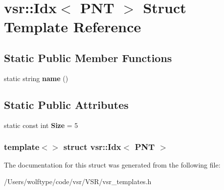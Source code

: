 \hypertarget{structvsr_1_1_idx_3_01_p_n_t_01_4}{\section{vsr\-:\-:Idx$<$ P\-N\-T $>$ Struct Template Reference}
\label{structvsr_1_1_idx_3_01_p_n_t_01_4}
}
\subsection*{Static Public Member Functions}
\begin{DoxyCompactItemize}
\item 
\hypertarget{structvsr_1_1_idx_3_01_p_n_t_01_4_abda2faacba30c4c8212985234f191267}{static string {\bfseries name} ()}\label{structvsr_1_1_idx_3_01_p_n_t_01_4_abda2faacba30c4c8212985234f191267}

\end{DoxyCompactItemize}
\subsection*{Static Public Attributes}
\begin{DoxyCompactItemize}
\item 
\hypertarget{structvsr_1_1_idx_3_01_p_n_t_01_4_aece004eeb1671f58ec3a2baf586d65eb}{static const int {\bfseries Size} = 5}\label{structvsr_1_1_idx_3_01_p_n_t_01_4_aece004eeb1671f58ec3a2baf586d65eb}

\end{DoxyCompactItemize}
\subsubsection*{template$<$$>$ struct vsr\-::\-Idx$<$ P\-N\-T $>$}



The documentation for this struct was generated from the following file\-:\begin{DoxyCompactItemize}
\item 
/\-Users/wolftype/code/vsr/\-V\-S\-R/vsr\-\_\-templates.\-h\end{DoxyCompactItemize}
